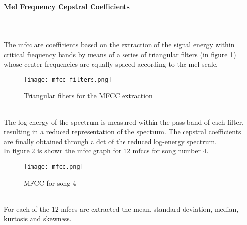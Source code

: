 \paragraph{Mel Frequency Cepstral Coefficients}
\mbox{} \\ \\
The \gls{mfcc} are coefficients based on the extraction of the signal energy within critical frequency bands by means of a series of triangular filters (in figure \ref{fig:mfcc_filters}) whose center frequencies are equally spaced according to the mel scale.
\begin{figure}[h]
    \centering
    \texttt{[image: mfcc\_filters.png]} 
	\caption{Triangular filters for the MFCC extraction}
    \label{fig:mfcc_filters}
\end{figure}
\\
The log-energy of the spectrum is measured within the pass-band of each filter, resulting in a reduced representation of the spectrum. The cepstral coefficients are finally obtained through a \gls{dct} of the reduced log-energy spectrum.
\\
In figure \ref{fig:mfcc} is shown the \gls{mfcc} graph for 12 mfccs for song number 4.
\begin{figure}[h]
    \centering
    \texttt{[image: mfcc.png]} 
	\caption{MFCC for song 4}
    \label{fig:mfcc}
\end{figure}
\\
For each of the $12$ \gls{mfcc}s are extracted the mean, standard deviation, median, kurtosis and skewness.

